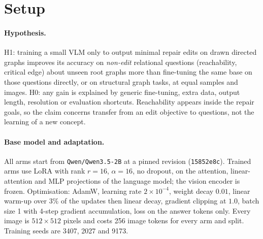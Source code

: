 \section{Setup}
\label{sec:setup}

\paragraph{Hypothesis.}
H1: training a small VLM only to output minimal repair edits on drawn directed graphs
improves its accuracy on \emph{non-edit} relational questions (reachability, critical edge)
about unseen root graphs more than fine-tuning the same base on those questions directly,
or on structural graph tasks, at equal samples and images. H0: any gain is explained by
generic fine-tuning, extra data, output length, resolution or evaluation shortcuts.
Reachability appears inside the repair goals, so the claim concerns transfer from an edit
objective to questions, not the learning of a new concept.

\paragraph{Base model and adaptation.}
All arms start from \texttt{Qwen/Qwen3.5-2B} at a pinned revision (\texttt{15852e8c}). Trained
arms use LoRA with rank $r=16$, $\alpha=16$, no dropout, on the attention, linear-attention
and MLP projections of the language model; the vision encoder is frozen. Optimisation:
AdamW, learning rate $2\times10^{-4}$, weight decay $0.01$, linear warm-up over $3\%$ of the
updates then linear decay, gradient clipping at $1.0$, batch size 1 with 4-step gradient
accumulation, loss on the answer tokens only. Every image is $512\times512$ pixels and costs
256 image tokens for every arm and split. Training seeds are 3407, 2027 and 9173.

